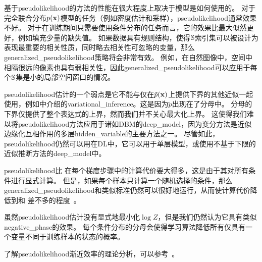 基于\gls{pseudolikelihood}的方法的性能在很大程度上取决于模型是如何使用的。
对于完全联合分布$p(\mathbf{x})$模型的任务（例如密度估计和采样），\gls{pseudolikelihood}通常效果不好。
对于在训练期间只需要使用条件分布的任务而言，它的效果比最大似然更好，例如填充少量的缺失值。
如果数据具有规则结构，使得$\mathbb{S}$索引集可以被设计为表现最重要的相关性质，同时略去相关性可忽略的变量，那么\gls{generalized_pseudolikelihood}策略将会非常有效。
例如，在自然图像中，空间中相隔很远的像素也具有弱相关性，因此\gls{generalized_pseudolikelihood}可以应用于每个$\mathbb{S}$集是小的局部空间窗口的情况。

\gls{pseudolikelihood}估计的一个弱点是它不能与仅在$\tilde{p}(\mathbf{x})$上提供下界的其他近似一起使用，例如中介绍的\gls{variational_inference}。这是因为$\tilde{p}$出现在了分母中。
分母的下界仅提供了整个表达式的上界，然而我们并不关心最大化上界。%
这使得我们难以将\gls{pseudolikelihood}方法应用于诸如\gls{DBM}的\gls{deep_model}，因为变分方法是近似边缘化互相作用的多层\gls{hidden_variable}的主要方法之一。
尽管如此，\gls{pseudolikelihood}仍然可以用在\gls{DL}中，它可以用于单层模型，或使用不基于下限的近似推断方法的\gls{deep_model}中。


\gls{pseudolikelihood}比\,\,在每个梯度步骤中的计算代价要大得多，这是由于其对所有条件进行显式计算。
但是，如果每个样本只计算一个随机选择的条件，那么\gls{generalized_pseudolikelihood}和类似标准仍然可以很好地运行，从而使计算代价降低到和\,\,差不多的程度~\citep{Goodfellow-et-al-NIPS2013}。


虽然\gls{pseudolikelihood}估计没有显式地最小化$\log Z$，但是我们仍然认为它具有类似\gls{negative_phase}的效果。
每个条件分布的分母会使得学习算法降低所有仅具有一个变量不同于训练样本的状态的概率。


了解\gls{pseudolikelihood}渐近效率的理论分析，可以参考~\cite{Marlin11-small}。

